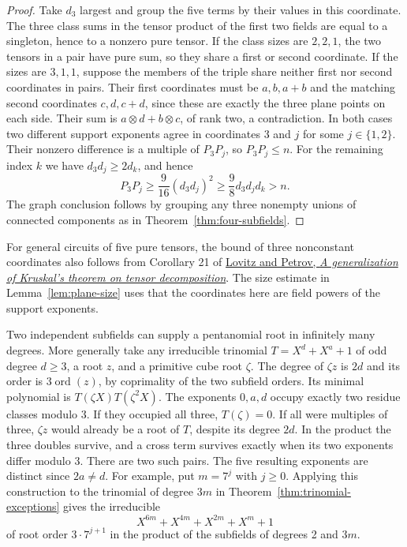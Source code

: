 \documentclass[11pt]{article}
\newcommand{\ord}{\operatorname{ord}}
\begin{document}
\begin{proof}
Take \(d_3\) largest and group the five terms by their values in
this coordinate. The three class sums in the tensor product of the
first two fields are equal to a singleton, hence to a nonzero pure
tensor. If the class sizes are \(2,2,1\), the two tensors in a pair
have pure sum, so they share a first or second coordinate. If the
sizes are \(3,1,1\), suppose the members of the triple share
neither first nor second coordinates in pairs. Their first
coordinates must be \(a,b,a+b\) and the matching second coordinates
\(c,d,c+d\), since these are exactly the three plane points on each
side. Their sum is \(a\otimes d+b\otimes c\), of rank two, a
contradiction. In both cases two different support exponents agree
in coordinates 3 and \(j\) for some \(j\in\{1,2\}\).
Their nonzero difference is a multiple of \(P_3P_j\), so
\(P_3P_j\le n\). For the remaining index \(k\) we have
\(d_3d_j\ge2d_k\), and hence
\[
     P_3P_j\ge\frac9{16}(d_3d_j)^2
              \ge\frac98 d_3d_jd_k>n .
\]
The graph conclusion follows by grouping any three nonempty unions
of connected components as in Theorem~\ref{thm:four-subfields}.
\end{proof}


For general circuits of five pure tensors, the bound of three
nonconstant coordinates also follows from Corollary 21 of
\href{https://doi.org/10.1017/fms.2023.20}{Lovitz and Petrov,
\emph{A generalization of Kruskal's theorem on tensor decomposition}}.
The size estimate in Lemma~\ref{lem:plane-size} uses that the
coordinates here are field powers of the support exponents.

Two independent subfields can supply a pentanomial root in infinitely
many degrees. More generally take any irreducible trinomial
\(T=X^d+X^a+1\) of odd degree \(d\ge3\), a root \(z\), and a
primitive cube root \(\zeta\). The degree of \(\zeta z\) is \(2d\)
and its order is \(3\ord(z)\), by coprimality of the two subfield
orders. Its minimal polynomial is \(T(\zeta X)T(\zeta^2 X)\).
The exponents \(0,a,d\) occupy exactly two residue classes modulo 3.
If they occupied all three, \(T(\zeta)=0\). If all were multiples
of three, \(\zeta z\) would already be a root of \(T\), despite
its degree \(2d\). In the product the three doubles survive, and
a cross term survives exactly when its two exponents differ modulo 3.
There are two such pairs. The five resulting exponents are distinct
since \(2a\ne d\). For example, put \(m=7^j\) with \(j\ge0\).
Applying this construction to the trinomial of degree \(3m\) in
Theorem~\ref{thm:trinomial-exceptions} gives the irreducible
\[
                   X^{6m}+X^{4m}+X^{2m}+X^m+1
\]
of root order \(3\cdot7^{j+1}\) in the product of the subfields
of degrees 2 and \(3m\).
\end{document}
